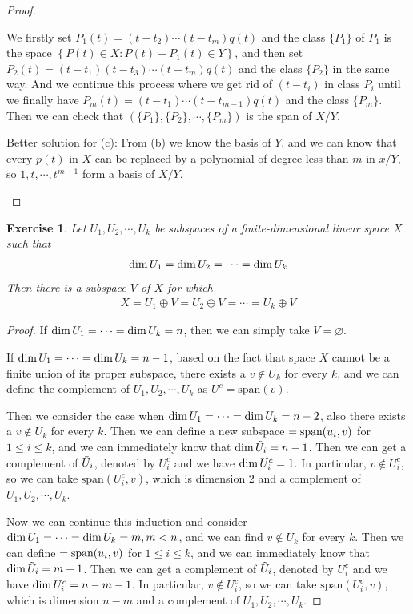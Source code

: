 \documentclass[11pt]{book}
\newtheorem{exercise}{Exercise}[section]
\theoremstyle{definition}
\numberwithin{equation}{chapter}
\begin{document}
\begin{proof}
\begin{enumerate}[label=(\alph*)]
    We firstly set $P_1(t) = (t-t_2)\cdots(t-t_m)q(t)$ and the class $\{P_1\}$ of $P_1$ is the space $\left\{P(t)\in X: P(t) - P_1(t) \in Y \right\}$, and then set $P_2(t) = (t-t_1)(t-t_3)\cdots(t-t_m)q(t)$ and the class $\{P_2 \}$ in the same way. And we continue this process where we get rid of $(t-t_i)$ in class $P_i$ until we finally have $P_m(t) = (t-t_1)\cdots(t-t_{m-1})q(t)$ and the class $\{P_m \}$. Then we can check that $( \{P_1\}, \{P_2\}, \cdots, \{P_m\})$ is the span of $X/Y$.
    
    Better solution for (c): From (b) we know the basis of $Y$, and we can know that every $p(t)$ in $X$ can be replaced by a polynomial of degree less than $m$ in $x/Y$, so $1, t, \cdots, t^{m-1}$ form a basis of $X/Y$.
\end{enumerate}
\end{proof}

\medskip

\begin{exercise}\label{ex_5}
Let $U_1,U_2,\cdots,U_k$ be subspaces of a finite-dimensional linear space $X$ such that
\begin{align*}
    {\rm dim}\,U_1 = {\rm dim}\,U_2 = \cdots = {\rm dim}\,U_k
\end{align*}
Then there is a subspace $V$ of $X$ for which
\begin{align*}
    X = U_1\oplus V = U_2\oplus V = \cdots = U_k\oplus V
\end{align*}
\end{exercise}
\begin{proof}
If ${\rm dim}\, U_1 = \cdots = {\rm dim}\, U_k = n$, then we can simply take $V = \varnothing$.

If ${\rm dim}\, U_1 = \cdots = {\rm dim}\, U_k = n-1$, based on the fact that space $X$ cannot be a finite union of its proper subspace, there exists a $v \notin U_k$ for every $k$, and we can define the complement of $U_1, U_2, \cdots, U_k$ as $U^c = \text{span}(v)$.

Then we consider the case when ${\rm dim}\, U_1 = \cdots = {\rm dim}\, U_k = n-2$, also there exists a $v \notin U_k$ for every $k$. Then we can define a new subspace $\title{\Tilde{U}_i} = \text{span}(u_i,v)$ for $1 \leq i \leq k$, and we can immediately know that ${\rm dim}\, \Tilde{U}_i = n - 1$. Then we can get a complement of $\Tilde{U}_i$, denoted by $U_i^c$ and we have ${\rm dim}\, U_i^c = 1$. In particular, $v \notin U_i^c$, so we can take $\text{span} (U_i^c, v)$, which is dimension $2$ and a complement of $U_1, U_2, \cdots, U_k$.

Now we can continue this induction and consider ${\rm dim}\, U_1 = \cdots = {\rm dim}\, U_k = m, m < n$, and we can find $v \notin U_k$ for every $k$. Then we can define $\title{\Tilde{U}_i} = \text{span}(u_i,v)$ for $1 \leq i \leq k$, and we can immediately know that ${\rm dim}\, \Tilde{U}_i = m + 1$. Then we can get a complement of $\Tilde{U}_i$, denoted by $U_i^c$ and we have ${\rm dim}\, U_i^c = n - m - 1$. In particular, $v \notin U_i^c$, so we can take $\text{span} (U_i^c, v)$, which is dimension $n - m$ and a complement of $U_1, U_2, \cdots, U_k$.
\end{proof}
\end{document}
